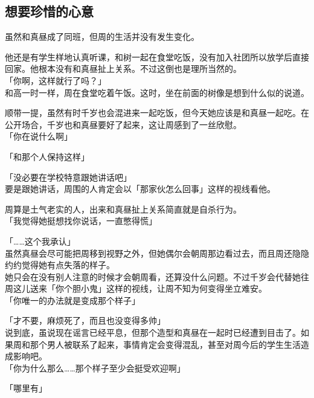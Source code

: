 \subsection{想要珍惜的心意}

虽然和真昼成了同班，但周的生活并没有发生变化。

他还是有学生样地认真听课，和树一起在食堂吃饭，没有加入社团所以放学后直接回家。他根本没有和真昼扯上关系。不过这倒也是理所当然的。\\

「你啊，这样就行了吗？」\\

和高一时一样，周在食堂吃着午饭。这时，坐在前面的树像是想到什么似的说道。

顺带一提，虽然有时千岁也会混进来一起吃饭，但今天她应该是和真昼一起吃。在公开场合，千岁也和真昼要好了起来，这让周感到了一丝欣慰。\\

「你在说什么啊」

「和那个人保持这样」

「没必要在学校特意跟她讲话吧」\\

要是跟她讲话，周围的人肯定会以「那家伙怎么回事」这样的视线看他。

周算是土气老实的人，出来和真昼扯上关系简直就是自杀行为。\\

「我觉得她挺想找你说话，一直憋得慌」

「……这个我承认」\\

虽然真昼会尽可能把周移到视野之外，但她偶尔会朝周那边看过去，而且周还隐隐约约觉得她有点失落的样子。\\

她只会在没有别人注意的时候才会朝周看，还算没什么问题。不过千岁会代替她往周这儿送来「你个胆小鬼」这样的视线，让周不知为何变得坐立难安。\\

「你唯一的办法就是变成那个样子」

「才不要，麻烦死了，而且也没变得多帅」\\

说到底，虽说现在谣言已经平息，但那个造型和真昼在一起时已经遭到目击了。如果周和那个男人被联系了起来，事情肯定会变得混乱，甚至对周今后的学生生活造成影响吧。\\

「你为什么那么……那个样子至少会挺受欢迎啊」

「哪里有」\\

